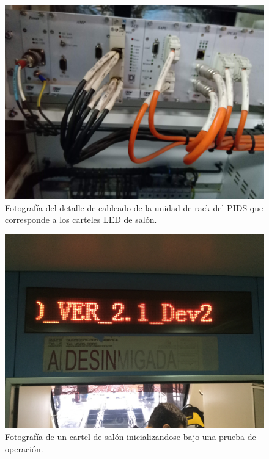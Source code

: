 \begin{figure}[ht]
	\centering
	\includegraphics[width=1\textwidth ]{./Figures/rackPIDS2.jpg}
	\caption{Fotografía del detalle de cableado de la unidad de rack del PIDS que corresponde a los carteles LED de salón.}
	\label{fig:rackPIDS2}
\end{figure}



\begin{figure}[ht]
	\centering
	\includegraphics[width=1\textwidth]{./Figures/cartelIniciando.JPG}
	\caption{Fotografía de un cartel de salón inicializandose bajo una prueba de operación.}
	\label{fig:cartelIniciando}
\end{figure}

